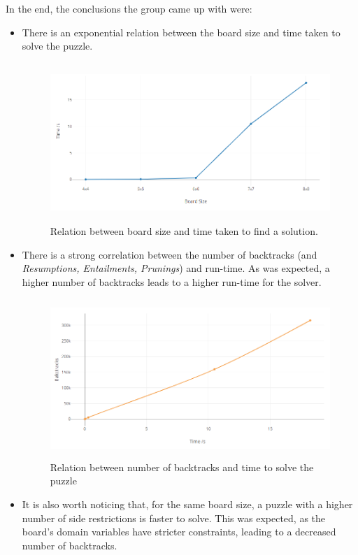 \documentclass{llncs}
\begin{document}
In the end, the conclusions the group came up with were:
\begin{itemize}
	\item There is an exponential relation between the board size and time taken to solve the puzzle.\\

\begin{figure}[h!]
\begin{center}
\includegraphics[height=6cm,width=12cm]{images/graph1.png}
\caption{Relation between board size and time taken to find a solution.}
\label{Figure 5}
\end{center}
\end{figure}

	\item There is a strong correlation between the number of backtracks (and \textit{Resumptions, Entailments, Prunings}) and run-time. As was expected, a higher number of backtracks leads to a higher run-time for the solver.\\

\begin{figure}[h!]
\begin{center}
\includegraphics[height=6cm,width=12cm]{images/graph2.png}
\caption{Relation between number of backtracks and time to solve the puzzle}
\label{Figure 6}
\end{center}
\end{figure}
	
	\item It is also worth noticing that, for the same board size, a puzzle with a higher number of side restrictions is faster to solve. This was expected, as the board's domain variables have stricter constraints, leading to a decreased number of backtracks.
\end{itemize}
\end{document}
